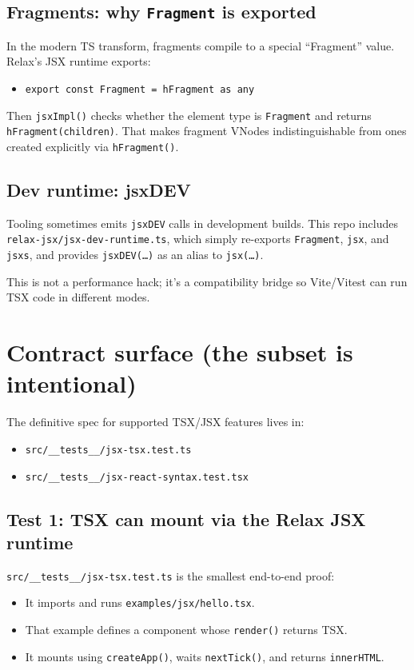 \subsection{Fragments: why \texttt{Fragment} is exported}
In the modern TS transform, fragments compile to a special ``Fragment'' value.
Relax's JSX runtime exports:

\begin{itemize}
  \item \texttt{export const Fragment = hFragment as any}
\end{itemize}

Then \texttt{jsxImpl()} checks whether the element type is \texttt{Fragment} and returns \texttt{hFragment(children)}.
That makes fragment VNodes indistinguishable from ones created explicitly via \texttt{hFragment()}.

\subsection{Dev runtime: jsxDEV}
Tooling sometimes emits \texttt{jsxDEV} calls in development builds.
This repo includes \texttt{relax-jsx/jsx-dev-runtime.ts}, which simply re-exports \texttt{Fragment}, \texttt{jsx}, and \texttt{jsxs}, and provides \texttt{jsxDEV(\ldots)} as an alias to \texttt{jsx(\ldots)}.

This is not a performance hack; it's a compatibility bridge so Vite/Vitest can run TSX code in different modes.

\section{Contract surface (the subset is intentional)}
The definitive spec for supported TSX/JSX features lives in:

\begin{itemize}
  \item \texttt{src/\_\_tests\_\_/jsx-tsx.test.ts}
  \item \texttt{src/\_\_tests\_\_/jsx-react-syntax.test.tsx}
\end{itemize}

\subsection{Test 1: TSX can mount via the Relax JSX runtime}
\texttt{src/\_\_tests\_\_/jsx-tsx.test.ts} is the smallest end-to-end proof:

\begin{itemize}
  \item It imports and runs \texttt{examples/jsx/hello.tsx}.
  \item That example defines a component whose \texttt{render()} returns TSX.
  \item It mounts using \texttt{createApp()}, waits \texttt{nextTick()}, and returns \texttt{innerHTML}.
\end{itemize}

